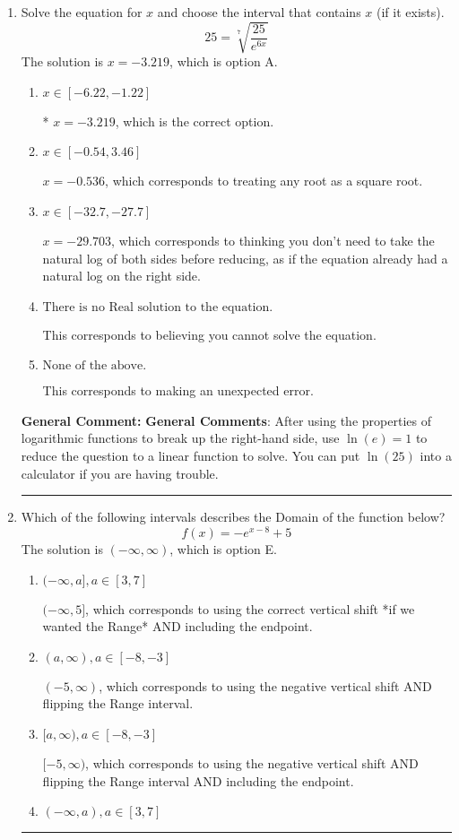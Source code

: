 \documentclass{extbook}[14pt]
\newcommand{\litem}[1]{\item #1

\rule{\textwidth}{0.4pt}}
\begin{document}
\begin{enumerate}\litem{
 Solve the equation for $x$ and choose the interval that contains $x$ (if it exists).
\[  25 = \sqrt[7]{\frac{25}{e^{6x}}} \]The solution is \( x = -3.219 \), which is option A.\begin{enumerate}[label=\Alph*.]
\item \( x \in [-6.22, -1.22] \)

* $x = -3.219$, which is the correct option.
\item \( x \in [-0.54, 3.46] \)

$x = -0.536$, which corresponds to treating any root as a square root.
\item \( x \in [-32.7, -27.7] \)

$x = -29.703$, which corresponds to thinking you don't need to take the natural log of both sides before reducing, as if the equation already had a natural log on the right side.
\item \( \text{There is no Real solution to the equation.} \)

This corresponds to believing you cannot solve the equation.
\item \( \text{None of the above.} \)

This corresponds to making an unexpected error.
\end{enumerate}

\textbf{General Comment:} \textbf{General Comments}: After using the properties of logarithmic functions to break up the right-hand side, use $\ln(e) = 1$ to reduce the question to a linear function to solve. You can put $\ln(25)$ into a calculator if you are having trouble.
}
\litem{
Which of the following intervals describes the Domain of the function below?
\[ f(x) = -e^{x-8}+5 \]The solution is \( (-\infty, \infty) \), which is option E.\begin{enumerate}[label=\Alph*.]
\item \( (-\infty, a], a \in [3, 7] \)

$(-\infty, 5]$, which corresponds to using the correct vertical shift *if we wanted the Range* AND including the endpoint.
\item \( (a, \infty), a \in [-8, -3] \)

$(-5, \infty)$, which corresponds to using the negative vertical shift AND flipping the Range interval.
\item \( [a, \infty), a \in [-8, -3] \)

$[-5, \infty)$, which corresponds to using the negative vertical shift AND flipping the Range interval AND including the endpoint.
\item \( (-\infty, a), a \in [3, 7] \)


\end{enumerate}}
\end{enumerate}
\end{document}
